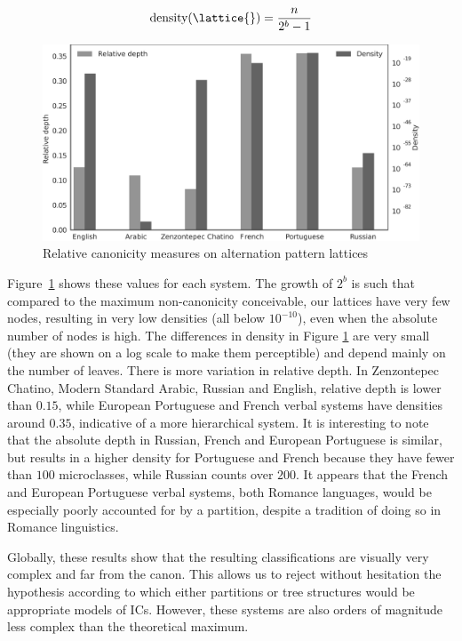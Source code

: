 \documentclass[output=paper]{langscibook}
\begin{document}
    \begin{equation}
    \text{density}(\lattice{}) = \frac{n}{2^{b}-1}
    \end{equation}
    
    \begin{figure}
        \centering
        \includegraphics[width=\linewidth]{figures/lattice-pat-canonicity.pdf}
        \caption{Relative canonicity measures on alternation pattern lattices}
        \label{fig:beniamine:compRelcanon}
    \end{figure}

    Figure~\ref{fig:beniamine:compRelcanon} shows these values for each system. The growth of $2^{b}$ is such that compared to the maximum non-canonicity conceivable, our lattices have very few nodes, resulting in very low densities (all below $10^{-10}$), even when the absolute number of nodes is high. The differences in density in Figure \ref{fig:beniamine:compRelcanon} are very small (they are shown on a log scale to make them perceptible) and depend mainly on the number of leaves. There is more variation in relative depth. In Zenzontepec Chatino, Modern Standard Arabic, Russian and English, relative depth is lower than $0.15$, while European Portuguese and French verbal systems have densities around $0.35$, indicative of a more hierarchical system. It is interesting to note that the absolute depth in Russian, French and European Portuguese is similar, but results in a higher density for Portuguese and French because they have fewer than $100$ microclasses, while Russian counts over $200$. It appears that the French and European Portuguese verbal systems, both Romance languages, would be especially poorly accounted for by a partition, despite a tradition of doing so in Romance linguistics.
           
    Globally, these results show that the resulting classifications are visually very complex and far from the canon. This allows us to reject without hesitation the hypothesis according to which either partitions or tree structures would be appropriate models of ICs. However, these systems are also orders of magnitude less complex than the theoretical maximum.
    
\end{document}
